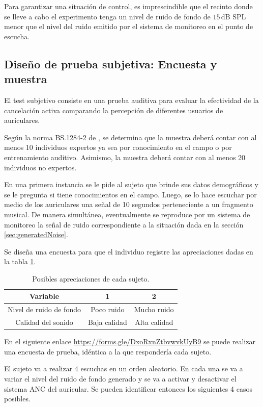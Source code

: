 \documentclass[a4paper,12pt]{article}
\begin{document}
Para garantizar una situación de control, es imprescindible que el recinto donde se lleve a cabo el experimento tenga un nivel de ruido de fondo de $15 \, \si{\deci \bel}$ SPL menor que el nivel del ruido emitido por el sistema de monitoreo en el punto de escucha.

\subsection{Diseño de prueba subjetiva: Encuesta y muestra}
\label{sec:test}

El test subjetivo consiste en una prueba auditiva para evaluar la efectividad de la cancelación activa comparando la percepción de diferentes usuarios de auriculares.

Según la norma BS.1284-2 de \textcite{ITU1284-2}, se determina que la muestra deberá contar con al menos 10 individuos expertos ya sea por conocimiento en el campo o por entrenamiento auditivo.
Asimismo, la muestra deberá contar con al menos 20 individuos no expertos.

En una primera instancia se le pide al sujeto que brinde sus datos demográficos y se le pregunta si tiene conocimientos en el campo.
Luego, se lo hace escuchar por medio de los auriculares una señal de 10 segundos perteneciente a un fragmento musical.
De manera simultánea, eventualmente se reproduce por un sistema de monitoreo la señal de ruido correspondiente a la situación dada en la sección \ref{sec:generatedNoise}.

Se diseña una encuesta para que el individuo registre las apreciaciones dadas en la tabla \ref{tab:appreciations}.

\begin{table}[ht]
\centering
\begin{tabular}{|c|c|c|}
  \hline
  \textbf{Variable} & \textbf{1} & \textbf{2} \\
  \hline
  Nivel de ruido de fondo & Poco ruido & Mucho ruido \\
  \hline
  Calidad del sonido & Baja calidad & Alta calidad \\
  \hline
\end{tabular}
\caption{Posibles apreciaciones de cada sujeto.}
\label{tab:appreciations}
\end{table}

En el siguiente enlace \url{https://forms.gle/DxoRxnZtbvwvkUyB9} se puede realizar una encuesta de prueba, idéntica a la que respondería cada sujeto.

El sujeto va a realizar 4 escuchas en un orden aleatorio.
En cada una se va a variar el nivel del ruido de fondo generado y se va a activar y desactivar el sistema ANC del auricular. Se pueden identificar entonces los siguientes 4 casos posibles.
\end{document}

